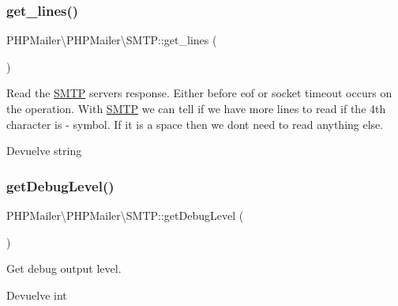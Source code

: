 \subsubsection{\texorpdfstring{get\+\_\+lines()}{get\_lines()}}
{\footnotesize\ttfamily P\+H\+P\+Mailer\textbackslash{}\+P\+H\+P\+Mailer\textbackslash{}\+S\+M\+T\+P\+::get\+\_\+lines (\begin{DoxyParamCaption}{ }\end{DoxyParamCaption})\hspace{0.3cm}{\ttfamily [protected]}}

Read the \hyperlink{classPHPMailer_1_1PHPMailer_1_1SMTP}{S\+M\+TP} server\textquotesingle{}s response. Either before eof or socket timeout occurs on the operation. With \hyperlink{classPHPMailer_1_1PHPMailer_1_1SMTP}{S\+M\+TP} we can tell if we have more lines to read if the 4th character is \textquotesingle{}-\/\textquotesingle{} symbol. If it is a space then we don\textquotesingle{}t need to read anything else.

\begin{DoxyReturn}{Devuelve}
string 
\end{DoxyReturn}
\mbox{\label{classPHPMailer_1_1PHPMailer_1_1SMTP_aa82c596be3af27398f63f1e98535f083}} 
\subsubsection{\texorpdfstring{get\+Debug\+Level()}{getDebugLevel()}}
{\footnotesize\ttfamily P\+H\+P\+Mailer\textbackslash{}\+P\+H\+P\+Mailer\textbackslash{}\+S\+M\+T\+P\+::get\+Debug\+Level (\begin{DoxyParamCaption}{ }\end{DoxyParamCaption})}

Get debug output level.

\begin{DoxyReturn}{Devuelve}
int 
\end{DoxyReturn}
\mbox{\label{classPHPMailer_1_1PHPMailer_1_1SMTP_a951b3268371599c41f3bc229f378afca}} 
